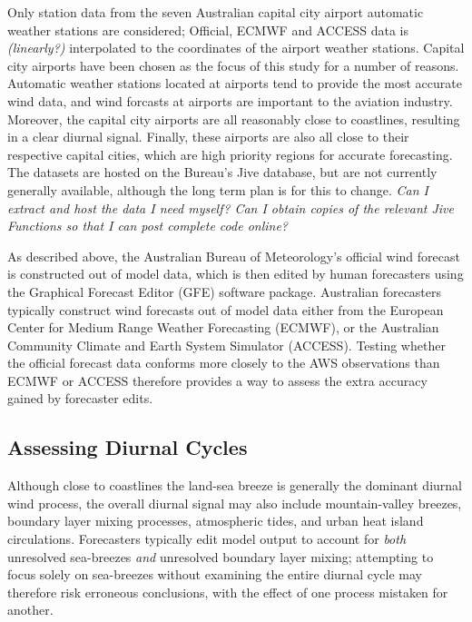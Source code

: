 \documentclass[alpha-refs]{wiley-article}
\begin{document}
Only station data from the seven Australian capital city airport automatic weather stations are considered; Official, ECMWF and ACCESS  data is \textit{(linearly?)} interpolated to the coordinates of the airport weather stations. Capital city airports have been chosen as the focus of this study for a number of reasons. Automatic weather stations located at airports tend to provide the most accurate wind data, and wind forcasts at airports are important to the aviation industry. Moreover, the capital city airports are all reasonably close to coastlines, resulting in a clear diurnal signal. Finally, these airports are also all close to their respective capital cities, which are high priority regions for accurate forecasting. The datasets are hosted on the Bureau's Jive database, but are not currently generally available, although the long term plan is for this to change. \textit{Can I extract and host the data I need myself? Can I obtain copies of the relevant Jive Functions so that I can post complete code online?}

As described above, the Australian Bureau of Meteorology's official wind forecast is constructed out of model data, which is then edited by human forecasters using the Graphical Forecast Editor (GFE) software package. Australian forecasters typically construct wind forecasts out of model data either from the European Center for Medium Range Weather Forecasting (ECMWF), or the Australian Community Climate and Earth System Simulator (ACCESS). Testing whether the official forecast data conforms more closely to the AWS observations than ECMWF or ACCESS therefore provides a way to assess the extra accuracy gained by forecaster edits.

\subsection{Assessing Diurnal Cycles}
Although close to coastlines the land-sea breeze is generally the dominant diurnal wind process, the overall diurnal signal may also include mountain-valley breezes, boundary layer mixing processes, atmospheric tides, and urban heat island circulations. Forecasters typically edit model output to account for \emph{both} unresolved sea-breezes \emph{and} unresolved boundary layer mixing; attempting to focus solely on sea-breezes without examining the entire diurnal cycle may therefore risk erroneous conclusions, with the effect of one process mistaken for another.
\end{document}

